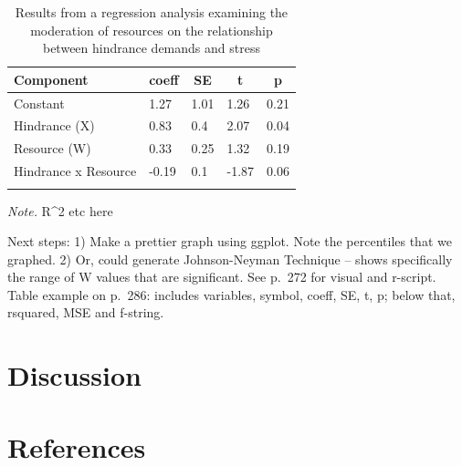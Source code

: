 \documentclass[
  man]{apa6}
\begin{document}
\begin{table}[tbp]

\begin{center}
\begin{threeparttable}

\caption{\label{tab:table}Results from a regression analysis examining the moderation of resources on the relationship between hindrance demands and stress}

\begin{tabular}{lllll}
\toprule
Component & \multicolumn{1}{c}{coeff} & \multicolumn{1}{c}{SE} & \multicolumn{1}{c}{t} & \multicolumn{1}{c}{p}\\
\midrule
Constant & 1.27 & 1.01 & 1.26 & 0.21\\
Hindrance (X) & 0.83 & 0.4 & 2.07 & 0.04\\
Resource (W) & 0.33 & 0.25 & 1.32 & 0.19\\
Hindrance x Resource & -0.19 & 0.1 & -1.87 & 0.06\\
\bottomrule
\addlinespace
\end{tabular}

\begin{tablenotes}[para]
\normalsize{\textit{Note.} R\textasciicircum{}2 etc here}
\end{tablenotes}

\end{threeparttable}
\end{center}

\end{table}

Next steps:
1) Make a prettier graph using ggplot. Note the percentiles that we graphed.
2) Or, could generate Johnson-Neyman Technique -- shows specifically the range of W values that are significant. See p.~272 for visual and r-script.
Table example on p.~286: includes variables, symbol, coeff, SE, t, p; below that, rsquared, MSE and f-string.

\hypertarget{discussion}{%
\section{Discussion}\label{discussion}}

\newpage

\hypertarget{references}{%
\section{References}\label{references}}

\begingroup
\setlength{\parindent}{-0.5in}
\setlength{\leftskip}{0.5in}
\end{document}
